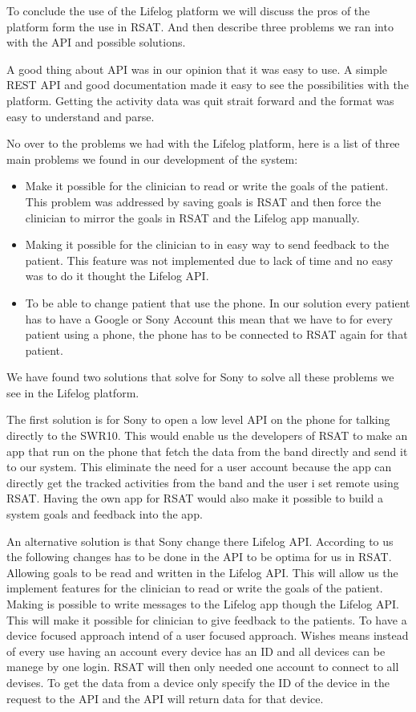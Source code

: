 \documentclass{cslthse-msc}
\begin{document}
To conclude the use of the Lifelog platform we will discuss the pros of the platform form the use in RSAT. And then describe three problems we ran into with the API and possible solutions.

A good thing about API was in our opinion that it was easy to use. A simple REST API and good documentation made it easy to see the possibilities with the platform. Getting the activity data was quit strait forward and the format was easy to understand and parse. 
 
No over to the problems we had with the Lifelog platform, here is a list of three main problems we found in our development of the system:

\begin{itemize}
\item Make it possible for the clinician to read or write the goals of the patient. This problem was addressed by saving goals is RSAT and then force the clinician to mirror the goals in RSAT and the Lifelog app manually.
\item 	Making it possible for the clinician to in easy way to send feedback to the patient. This feature was not implemented due to lack of time and no easy was to do it thought the Lifelog API.
\item To be able to change patient that use the phone. In our solution every patient has to have a Google or Sony Account this mean that we have to for every patient using a phone, the phone has to be connected to RSAT again for that  patient.
\end{itemize}

We have found two solutions that solve for Sony to solve all these problems we see in the Lifelog platform.

The first solution is for Sony to open a low level API on the phone for talking directly to the SWR10. This would enable us the developers of RSAT to make an app that run on the phone that fetch the data from the band directly and send it to our system. This eliminate the need for a user account because the app can directly get the tracked activities from the band and the user i set remote using RSAT. Having the own app for RSAT would also make it possible to build a system  goals and feedback into the app.

An alternative solution is that Sony change there Lifelog API. According to us the following changes  has to be done in the API to be optima for us in RSAT.
 Allowing goals to be read and written in the Lifelog API. This will allow us the implement features for the clinician to read or write the goals of the patient.
 Making is possible to write messages to the Lifelog app though the Lifelog API. This will make it possible for clinician to give feedback to the patients.
To have a device focused approach intend of a user focused approach.  Wishes means instead of every use having an account every device has an ID and all devices can be manege by one login. RSAT will then only needed one account to connect to all devises. To get the data from a device only specify the ID of the device in the request to the API and the API will return data for that device.
\end{document}

